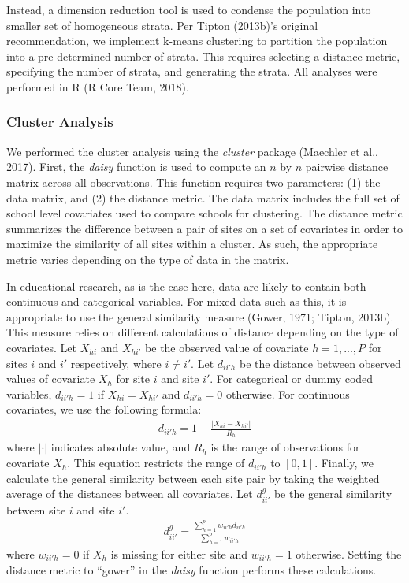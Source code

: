 \documentclass[
  english,
  man,floatsintext]{apa6}
\begin{document}
Instead, a dimension reduction tool is used to condense the population into smaller set of homogeneous strata. Per Tipton (2013b)'s original recommendation, we implement k-means clustering to partition the population into a pre-determined number of strata. This requires selecting a distance metric, specifying the number of strata, and generating the strata. All analyses were performed in R (R Core Team, 2018).

\hypertarget{cluster-analysis}{%
\subsubsection{Cluster Analysis}\label{cluster-analysis}}

We performed the cluster analysis using the \emph{cluster} package (Maechler et al., 2017). First, the \emph{daisy} function is used to compute an \(n\) by \(n\) pairwise distance matrix across all observations. This function requires two parameters: (1) the data matrix, and (2) the distance metric. The data matrix includes the full set of school level covariates used to compare schools for clustering. The distance metric summarizes the difference between a pair of sites on a set of covariates in order to maximize the similarity of all sites within a cluster. As such, the appropriate metric varies depending on the type of data in the matrix.

In educational research, as is the case here, data are likely to contain both continuous and categorical variables. For mixed data such as this, it is appropriate to use the general similarity measure (Gower, 1971; Tipton, 2013b). This measure relies on different calculations of distance depending on the type of covariates. Let \(X_{hi}\) and \(X_{hi'}\) be the observed value of covariate \(h = {1, ..., P}\) for sites \(i\) and \(i'\) respectively, where \(i \ne i'\). Let \(d_{ii'h}\) be the distance between observed values of covariate \(X_{h}\) for site \(i\) and site \(i'\). For categorical or dummy coded variables, \(d_{ii'h} = 1\) if \(X_{hi} = X_{hi'}\) and \(d_{ii'h} = 0\) otherwise. For continuous covariates, we use the following formula:
\begin{align}
d_{ii'h} = 1 - \frac{|X_{hi} - X_{hi'}|}{R_h}
\end{align}
where \(|\cdot|\) indicates absolute value, and \(R_h\) is the range of observations for covariate \(X_h\). This equation restricts the range of \(d_{ii'h}\) to \([0,1]\). Finally, we calculate the general similarity between each site pair by taking the weighted average of the distances between all covariates. Let \(d^{g}_{ii'}\) be the general similarity between site \(i\) and site \(i'\).
\begin{align}
d^{g}_{ii'} = \frac{\sum^p_{h = 1}w_{ii'h}d_{ii'h}}{\sum^p_{h = 1}w_{ii'h}}
\end{align}
where \(w_{ii'h} = 0\) if \(X_h\) is missing for either site and \(w_{ii'h} = 1\) otherwise. Setting the distance metric to \enquote{gower} in the \emph{daisy} function performs these calculations.
\end{document}
